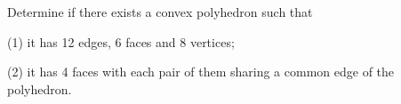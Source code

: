 Determine if there exists a convex polyhedron such that

(1) it has 12 edges, 6 faces and 8 vertices;

(2) it has 4 faces with each pair of them sharing a common edge of the polyhedron.